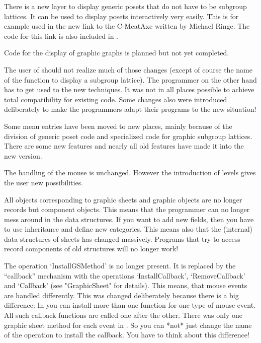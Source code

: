 There is a new layer to display generic posets that do not have to be
subgroup lattices. It can be used to display posets interactively very
easily. This is for example used in the new link to the C-MeatAxe written
by Michael Ringe. The code for this link is also included in {}.

Code for the display of graphic graphs is planned but not yet completed.

The user of {\XGAP} should not realize much of those changes (except of
course the name of the function to display a subgroup lattice). The
programmer on the other hand has to get used to the new techniques. It was
not in all places possible to achieve total compatibility for existing
code. Some changes also were introduced deliberately to make the
programmers adapt their programs to the new situation!



Some menu entries have been moved to new places, mainly because of the
division of generic poset code and specialized code for graphic subgroup
lattices. There are some new features and nearly all old features have made 
it into the new version.

The handling of the mouse is unchanged. However the introduction of levels
gives the user new possibilities.


All {\GAP} objects corresponding to graphic sheets and graphic objects are
no longer records but component objects. This means that the programmer can 
no longer mess around in the data structures. If you want to add new
fields, then you have to use inheritance and define new categories. This
means also that the (internal) data structures of sheets has changed
massively. Programs that try to access record components of old {\XGAP}
structures will no longer work!

The operation `InstallGSMethod' is no longer present. It is replaced by the 
``callback'' mechanism with the operations `InstallCallback',
`RemoveCallback' and `Callback' (see "GraphicSheet" for details). This
means, that mouse events are handled differently. This was changed
deliberately because there is a big difference: In {} you can install 
more than one function for one type of mouse event. All such callback
functions are called one after the other. There was only one graphic sheet
method for each event in {}. So you can *not* just change the name of 
the operation to install the callback. You have to think about this
difference! 

